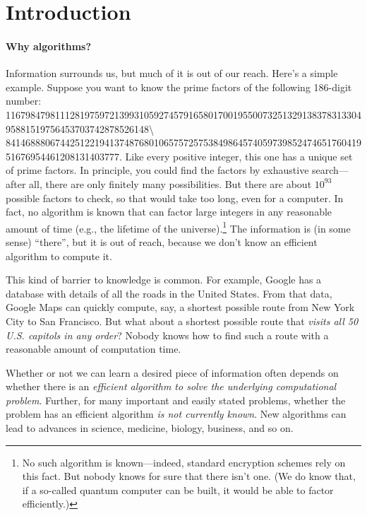 
\section{Introduction}

\paragraph{Why algorithms?}
Information surrounds us, but much of it is out of our reach. 
Here's a simple example.
Suppose you want to know the prime factors of the following 186-digit number:
{\footnotesize
11679847981112819759721399310592745791658017001955007325132913837831330495881519756453703742878526148\textbackslash\\84146888067442512219413748768010657572575384986457405973985247465176041951676954461208131403777}. 
Like every positive integer, this one has a unique set of prime factors.
In principle, you could find the factors by exhaustive search---after all, there are only finitely many possibilities.
But there are about $10^{93}$ possible factors to check,
so that would take too long, even for a computer.
In fact, no algorithm is known that can factor large integers
in any reasonable amount of time
(e.g., the lifetime of the universe).\footnote
{No such algorithm is known---indeed, standard encryption schemes rely on this fact.
  But nobody knows for sure that there isn't one.
  (We do know that, if a so-called quantum computer can be built,
  it would be able to factor efficiently.)}
The information is (in some sense) ``there'', but it is out of reach,
because we don't know an efficient algorithm to compute it.

This kind of barrier to knowledge is common.
For example, Google has a database with details of all the roads in the United States.
From that data, Google Maps can quickly compute, say, a shortest possible route from New York City to San Francisco.
But what about a shortest possible route that \emph{visits all 50 U.S. capitols in any order}?
Nobody knows how to find such a route with a reasonable amount of computation time.

Whether or not we can learn a desired piece of information often depends on whether there is an \emph{efficient algorithm to solve the underlying computational problem}.  Further, for many important and easily stated problems, whether the problem has an efficient algorithm \emph{is not currently known}.  New algorithms can lead to advances in science, medicine, biology, business, and so on.  %

